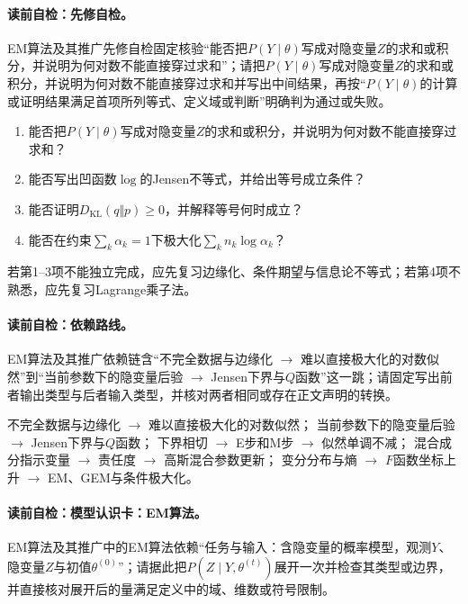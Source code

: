 \label{struct:V3-C04-CH03}
\paragraph{读前自检：先修自检。}EM算法及其推广先修自检固定核验“能否把$P(Y\mid\theta)$写成对隐变量$Z$的求和或积分，并说明为何对数不能直接穿过求和”；请把$P(Y\mid\theta)$写成对隐变量$Z$的求和或积分，并说明为何对数不能直接穿过求和并写出中间结果，再按“$P(Y\mid\theta)$的计算或证明结果满足首项所列等式、定义域或判断”明确判为通过或失败。\par

\begin{precheckbox}
\begin{enumerate}[leftmargin=2.2em]
  \item 能否把$P(Y\mid\theta)$写成对隐变量$Z$的求和或积分，并说明为何对数不能直接穿过求和？
  \item 能否写出凹函数$\log$的Jensen不等式，并给出等号成立条件？
  \item 能否证明$D_{\mathrm{KL}}(q\Vert p)\geq0$，并解释等号何时成立？
  \item 能否在约束$\sum_k\alpha_k=1$下极大化$\sum_kn_k\log\alpha_k$？
\end{enumerate}
若第1--3项不能独立完成，应先复习边缘化、条件期望与信息论不等式；若第4项不熟悉，应先复习Lagrange乘子法。
\end{precheckbox}

\label{struct:V3-C04-CH04}
\paragraph{读前自检：依赖路线。}EM算法及其推广依赖链含“不完全数据与边缘化 $\to$ 难以直接极大化的对数似然”到“当前参数下的隐变量后验 $\to$ Jensen下界与$Q$函数”这一跳；请固定写出前者输出类型与后者输入类型，并核对两者相同或存在正文声明的转换。\par

\begin{dependencybox}
不完全数据与边缘化 $\to$ 难以直接极大化的对数似然；
当前参数下的隐变量后验 $\to$ Jensen下界与$Q$函数；
下界相切 $\to$ E步和M步 $\to$ 似然单调不减；
混合成分指示变量 $\to$ 责任度 $\to$ 高斯混合参数更新；
变分分布与熵 $\to$ $F$函数坐标上升 $\to$ EM、GEM与条件极大化。
\end{dependencybox}

\paragraph{读前自检：模型认识卡：EM算法。}EM算法及其推广中的EM算法依赖“任务与输入：含隐变量的概率模型，观测$Y$、隐变量$Z$与初值$\theta^{(0)}$”；请据此把$P(Z\mid Y,\theta^{(t)})$展开一次并检查其类型或边界，并直接核对展开后的量满足定义中的域、维数或符号限制。\par

